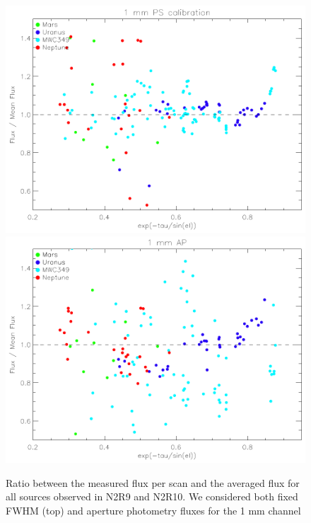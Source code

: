 \begin{figure}[ht]
\begin{center}
\includegraphics[clip, angle=0, scale = 0.7]{Figures/flux_1mm_ratio_run22_23.pdf}
\includegraphics[clip, angle=0, scale = 0.7]{Figures/flux_1mm_ap_ratio_run22_23.pdf}
\caption[N2R9 and N2R10 1mm flux stability]{Ratio between the measured flux per scan and the averaged flux for all sources observed in N2R9 and N2R10. We considered both fixed FWHM (top) and aperture photometry fluxes for the 1 mm channel }
\label{fig:fluxvsscan}
\end{center}
\end{figure}

